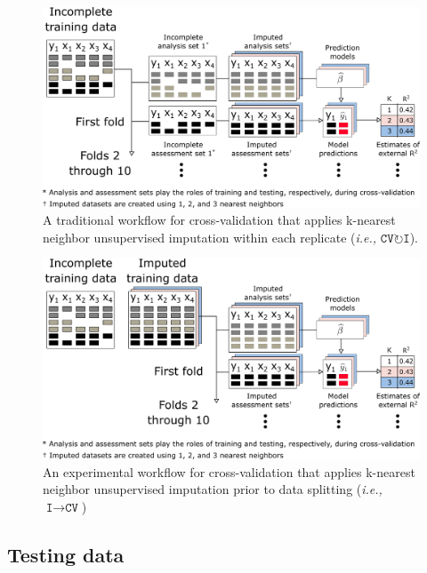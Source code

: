 \documentclass[AMA,STIX1COL,doublespace]{WileyNJD-v2}
\begin{document}
\begin{figure}
\includegraphics[width=1\linewidth]{figs/workflow_CVI} 
\caption{A traditional workflow for cross-validation that applies k-nearest neighbor unsupervised imputation within each replicate (\textit{i.e., }$\texttt{CV}\!\circlearrowright\!\texttt{I}$).}
\label{fig:workflow_cvi}
\end{figure}

\begin{figure}
\includegraphics[width=1\linewidth]{figs/workflow_ICV} 
\caption{An experimental workflow for cross-validation that applies k-nearest neighbor unsupervised imputation prior to data splitting (\textit{i.e., }$\texttt{I}\!\!\rightarrow\!\texttt{CV}$)}
\label{fig:workflow_icv}
\end{figure}

\subsection{Testing data}
\end{document}
